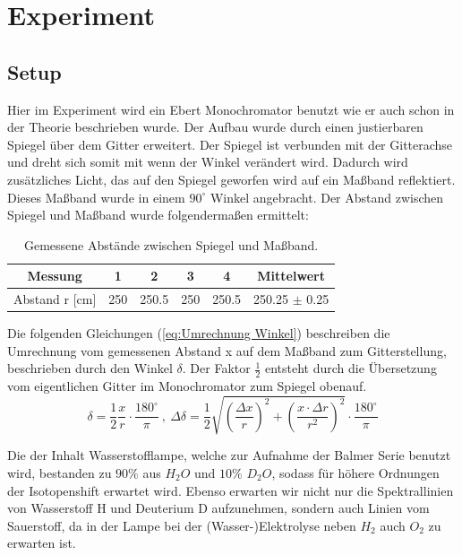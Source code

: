 \documentclass[]{article}
\begin{document}
\newpage
\section{Experiment}
\subsection{Setup}

Hier im Experiment wird ein Ebert Monochromator benutzt wie er auch schon in der Theorie beschrieben wurde. Der Aufbau wurde durch einen justierbaren Spiegel über dem Gitter erweitert. Der Spiegel ist verbunden mit der Gitterachse und dreht sich somit mit wenn der Winkel verändert wird. Dadurch wird zusätzliches Licht, das auf den Spiegel geworfen wird auf ein Maßband reflektiert. Dieses Maßband wurde in einem $90^\circ$ Winkel angebracht. Der Abstand zwischen Spiegel und Maßband wurde folgendermaßen ermittelt:

\begin{table}[H]
	\centering
	\begin{tabular}{c|c|c|c|c|c}
		Messung & 1 & 2 & 3 & 4 & Mittelwert \\
		\hline
		Abstand r [cm] & 250 & 250.5 & 250 & 250.5 & 250.25 $\pm$ 0.25 \\
	\end{tabular}
	\caption{Gemessene Abstände zwischen Spiegel und Maßband.}
\end{table}

Die folgenden Gleichungen (\ref{eq:Umrechnung Winkel}) beschreiben die Umrechnung vom gemessenen Abstand x auf dem Maßband zum Gitterstellung, beschrieben durch den Winkel $\delta$. Der Faktor $\frac{1}{2}$ entsteht durch die Übersetzung vom eigentlichen Gitter im Monochromator zum Spiegel obenauf.
\begin{equation}\label{eq:Umrechnung Winkel}
\delta= \frac{1}{2}\frac{x}{r} \cdot \frac{180^\circ}{\pi} \:,\: \Delta\delta= \frac{1}{2} \sqrt{\left(\frac{\Delta x}{r}\right)^2 + \left(\frac{x\cdot \Delta r}{r^2}\right)^2} \cdot \frac{180^\circ}{\pi}
\end{equation}

Die der Inhalt Wasserstofflampe, welche zur Aufnahme der Balmer Serie benutzt wird, bestanden zu $90\%$ aus $H_2O$ und $10\%$ $D_2O$, sodass für höhere Ordnungen der Isotopenshift erwartet wird. Ebenso erwarten wir nicht nur die Spektrallinien von Wasserstoff H und Deuterium D aufzunehmen, sondern auch Linien vom Sauerstoff, da in der Lampe bei der (Wasser-)Elektrolyse neben $H_2$ auch $O_2$ zu erwarten ist.
\end{document}
